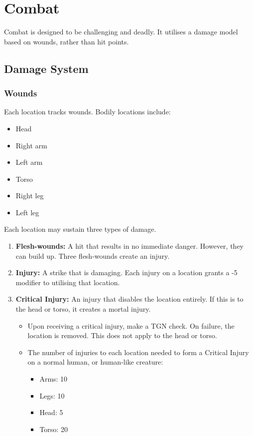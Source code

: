 \documentclass[]{article}
\date{}
\providecommand{\tightlist}{%
  \setlength{\itemsep}{0pt}\setlength{\parskip}{0pt}}
\begin{document}
\section{Combat}\label{combat}

Combat is designed to be challenging and deadly. It utilises a damage
model based on wounds, rather than hit points.

\subsection{Damage System}\label{damage-system}

\subsubsection{Wounds}\label{wounds}

Each location tracks wounds. Bodily locations include:

\begin{itemize}
\tightlist
\item
  Head
\item
  Right arm
\item
  Left arm
\item
  Torso
\item
  Right leg
\item
  Left leg
\end{itemize}

Each location may sustain three types of damage.

\begin{enumerate}
\def\labelenumi{\arabic{enumi}.}
\tightlist
\item
  \textbf{Flesh-wounds:} A hit that results in no immediate danger.
  However, they can build up. Three flesh-wounds create an injury.
\item
  \textbf{Injury:} A strike that is damaging. Each injury on a location
  grants a -5 modifier to utilising that location.
\item
  \textbf{Critical Injury:} An injury that disables the location
  entirely. If this is to the head or torso, it creates a mortal injury.

  \begin{itemize}
  \tightlist
  \item
    Upon receiving a critical injury, make a TGN check. On failure, the
    location is removed. This does not apply to the head or torso.
  \item
    The number of injuries to each location needed to form a Critical
    Injury on a normal human, or human-like creature:

    \begin{itemize}
    \tightlist
    \item
      Arms: 10
    \item
      Legs: 10
    \item
      Head: 5
    \item
      Torso: 20
    \end{itemize}
  \end{itemize}
\end{enumerate}
\end{document}
